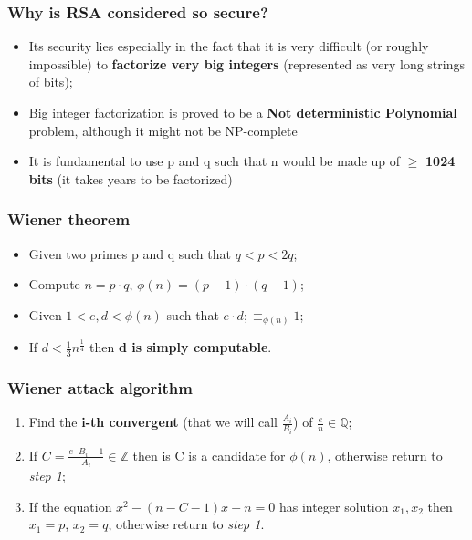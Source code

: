 \documentclass{beamer}
\begin{document}
\frame{\sectionpage}


	\begin{frame}
 		 \frametitle{Why is RSA considered so secure?}
			
			\begin{itemize}
			\item Its security lies especially in the fact that it is very difficult (or roughly impossible) to \textbf{factorize very big integers} (represented as very long strings of bits);
			\item Big integer factorization is proved to be a \textbf{Not deterministic Polynomial} problem, although it might not be NP-complete
			\item It is fundamental to use p and q such that n would be made up of $\geq$ \textbf{1024 bits} (it takes years to be factorized)
			\end{itemize}
  		\end{frame}
  		
  \begin{frame}
  \frametitle{Wiener theorem}
    \begin{itemize}
    	\item Given two primes p and q such that $q < p < 2q$;
    	\item Compute $n = p \cdot q$, $\phi(n) = (p-1) \cdot (q-1)$;
    	\item Given $1 < e,d < \phi(n)$ such that $e \cdot d; \equiv_{\phi(n)} 1$;
    	\item If $d < \frac { 1 }{ 3 } { n }^{ \frac { 1 }{ 4 }  }$ then \textbf{d is simply computable}.
    \end{itemize}
    
  \end{frame}
  
  \begin{frame}
  \frametitle{Wiener attack algorithm}
  
  \begin{enumerate}
  
  \item Find the \textbf{i-th convergent} (that we will call $\frac{A_i}{B_i}$) of $\frac { e }{ n }  \in  \mathbb{Q}$;
  \item If $C = \frac{e \cdot B_i - 1}{A_i} \in \mathbb{Z}$ then is C is a candidate for $\phi(n)$, otherwise return to \textit{step 1};
  \item If the equation ${x}^{2} - (n - C - 1)x + n = 0$ has integer solution $x_1, x_2$ then $x_1 = p$, $x_2 = q$, otherwise return to \textit{step 1}.
  
  \end{enumerate}
  
  \end{frame}
  
\end{document}
